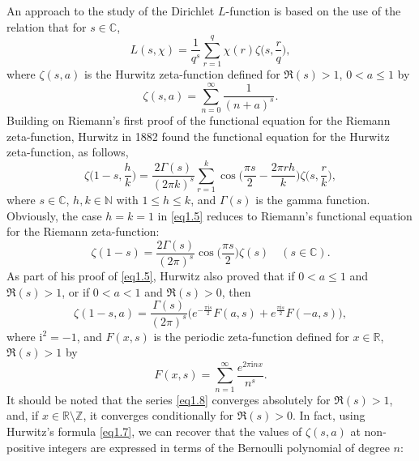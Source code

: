 \documentclass[reqno]{amsart}
\numberwithin{equation}{section}
\begin{document}
An approach to the study of the Dirichlet $L$-function is based on the use of the relation that for $s\in\mathbb{C}$,
\begin{equation}\label{eq1.3}
L(s,\chi)=\frac{1}{q^{s}}\sum_{r=1}^{q}\chi(r)\zeta\biggl(s,\frac{r}{q}\biggl),
\end{equation}
where $\zeta(s,a)$ is the Hurwitz zeta-function defined for $\Re(s)>1$, $0<a\leqslant1$ by
\begin{equation}\label{eq1.4}
\zeta(s,a)=\sum_{n=0}^{\infty}\frac{1}{(n+a)^{s}}.
\end{equation}
Building on Riemann's first proof \cite{riemann} of the functional equation for the Riemann zeta-function, Hurwitz \cite{hurwitz} in 1882 found the functional equation for the Hurwitz zeta-function, as follows,
\begin{equation}\label{eq1.5}
\zeta\biggl(1-s,\frac{h}{k}\biggl)=\frac{2\Gamma(s)}{(2\pi k)^{s}}\sum_{r=1}^{k}\cos\biggl(\frac{\pi s}{2}-\frac{2\pi rh}{k}\biggl)\zeta\biggl(s,\frac{r}{k}\biggl),
\end{equation}
where $s\in\mathbb{C}$, $h,k\in\mathbb{N}$ with $1\leqslant h\leqslant k$, and $\Gamma(s)$ is the gamma function. Obviously, the case $h=k=1$ in \eqref{eq1.5} reduces to Riemann's functional equation for the Riemann
zeta-function:
\begin{equation}\label{eq1.6}
\zeta(1-s)=\frac{2\Gamma(s)}{(2\pi)^{s}}\cos\biggl(\frac{\pi s}{2}\biggl)\zeta(s)\quad(s\in\mathbb{C}).
\end{equation}
As part of his proof of \eqref{eq1.5}, Hurwitz \cite{hurwitz} also proved that if $0<a\leqslant1$ and $\Re(s)>1$, or if $0<a<1$ and $\Re(s)>0$, then
\begin{equation}\label{eq1.7}
\zeta(1-s,a)=\frac{\Gamma(s)}{(2\pi)^{s}}\bigl(e^{-\frac{\pi \mathrm{i}s}{2}}F(a,s)+e^{\frac{\pi \mathrm{i}s}{2}}F(-a,s)\bigl),
\end{equation}
where $\mathrm{i}^{2}=-1$, and $F(x,s)$ is the periodic zeta-function defined for $x\in\mathbb{R}$, $\Re(s)>1$ by
\begin{equation}\label{eq1.8}
F(x,s)=\sum_{n=1}^{\infty}\frac{e^{2\pi \mathrm{i}nx}}{n^{s}}.
\end{equation}
It should be noted that the series \eqref{eq1.8} converges absolutely for $\Re(s)>1$, and, if $x\in\mathbb{R}\setminus\mathbb{Z}$, it converges conditionally for $\Re(s)>0$. In fact, using Hurwitz's formula \eqref{eq1.7}, we can recover that the values of $\zeta(s,a)$ at non-positive integers are expressed in terms of the Bernoulli polynomial of degree $n$:
\end{document}
